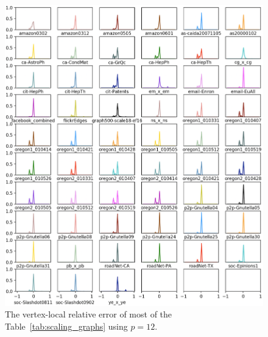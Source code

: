 \documentclass[10]{report}
\begin{document}
\begin{figure}
	\centerline{\includegraphics[width=1.0\columnwidth]{distn_vertex_total}}
	\caption{The vertex-local relative error of most of the  Table~\ref{tab:scaling_graphs} using $p=12$.
	\label{fig:distn_vertex}}
\end{figure}
\end{document}
